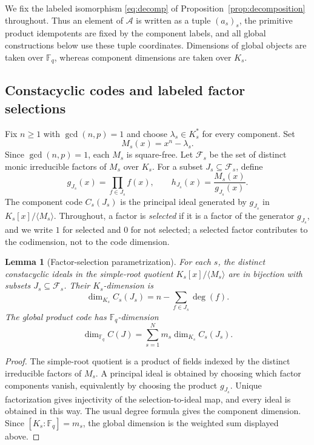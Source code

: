 \documentclass[10pt,a4paper]{article}
\newcommand{\F}{\mathbb F}
\newcommand{\A}{\mathcal A}
\newcommand{\Fs}{\mathcal F_s}
\numberwithin{equation}{section}
\theoremstyle{plain}
\newtheorem{lemma}[theorem]{Lemma}
\theoremstyle{definition}
\theoremstyle{remark}
\begin{document}
We fix the labeled isomorphism \eqref{eq:decomp} of
Proposition~\ref{prop:decomposition} throughout. Thus an element of $\A$ is
written as a tuple $(a_s)_s$, the primitive product idempotents are fixed by the
component labels, and all global constructions below use these tuple
coordinates. Dimensions of global objects are taken over $\F_q$, whereas
component dimensions are taken over $K_s$.

\subsection{Constacyclic codes and labeled factor selections}\label{sec:selections}

Fix $n\geq 1$ with $\gcd(n,p)=1$ and choose $\lambda_s\in K_s^*$ for every
component. Set
\[
M_s(x)=x^n-\lambda_s .
\]
Since $\gcd(n,p)=1$, each $M_s$ is square-free. Let $\Fs$ be the set of distinct
monic irreducible factors of $M_s$ over $K_s$. For a subset $J_s\subseteq\Fs$,
define
\[
g_{J_s}(x)=\prod_{f\in J_s}f(x),
\qquad
h_{J_s}(x)=\frac{M_s(x)}{g_{J_s}(x)} .
\]
The component code $C_s(J_s)$ is the principal ideal generated by $g_{J_s}$ in
$K_s[x]/\langle M_s\rangle$. Throughout, a factor is \emph{selected} if it is a
factor of the generator $g_{J_s}$, and we write $1$ for selected and $0$ for not
selected; a selected factor contributes to the codimension, not to the code
dimension.

\begin{lemma}[Factor-selection parametrization]\label{lem:factor-selection}
For each $s$, the distinct constacyclic ideals in the simple-root quotient
$K_s[x]/\langle M_s\rangle$ are in bijection with subsets $J_s\subseteq\Fs$.
Their $K_s$-dimension is
\[
\dim_{K_s}C_s(J_s)=n-\sum_{f\in J_s}\deg(f).
\]
The global product code has $\F_q$-dimension
\[
\dim_{\F_q}C(J)=\sum_{s=1}^{N}m_s\dim_{K_s}C_s(J_s).
\]
\end{lemma}

\begin{proof}
The simple-root quotient is a product of fields indexed by the distinct
irreducible factors of $M_s$. A principal ideal is obtained by choosing which
factor components vanish, equivalently by choosing the product $g_{J_s}$. Unique
factorization gives injectivity of the selection-to-ideal map, and every ideal
is obtained in this way. The usual degree formula gives the component dimension.
Since $[K_s:\F_q]=m_s$, the global dimension is the weighted sum displayed
above.
\end{proof}
\end{document}
